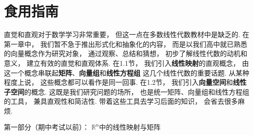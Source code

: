 \section*{食用指南}

直觉和直观对于数学学习非常重要，
但这一点在多数线性代数教材中是缺乏的.
在第一章中，
我们暂不急于推出形式化和抽象化的内容，
而是以我们高中就已熟悉的向量概念作为研究对象，
通过观察、总结和猜想，
初步了解线性代数的动机和意义，
建立有效的直觉和直观体系.
在1.1节，
我们引入\textbf{线性映射}的直观概念，
由这一个概念串联起\textbf{矩阵}、\textbf{向量组}和\textbf{线性方程组}
这几个线性代数的重要话题.
从某种程度上说，
这些概念都可以看作是同一回事.
在1.2节，
我们引入\textbf{向量空间}和\textbf{线性子空间}的概念.
这既是我们研究问题的场所，
也是统一矩阵、向量组和线性方程组的工具，
兼具直观性和简洁性.
带着这些工具去学习后面的知识，
会省去很多麻烦.


第一部分（期中考试以前）：
$\mathbb{R}^n$中的线性映射与矩阵